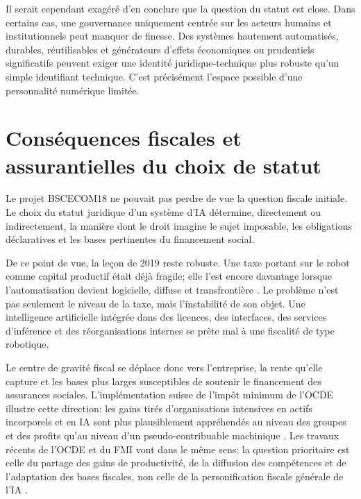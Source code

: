 \documentclass[11pt]{article}
\begin{document}
Il serait cependant exag{\'e}r{\'e} d'en conclure que la question du statut est close. Dans certains cas, une gouvernance uniquement centr{\'e}e sur les acteurs humains et institutionnels peut manquer de finesse. Des syst{\`e}mes hautement automatis{\'e}s, durables, r{\'e}utilisables et g{\'e}n{\'e}rateurs d'effets {\'e}conomiques ou prudentiels significatifs peuvent exiger une identit{\'e} juridique-technique plus robuste qu'un simple identifiant technique. C'est pr{\'e}cis{\'e}ment l'espace possible d'une personnalit{\'e} num{\'e}rique limit{\'e}e.

\section{Cons{\'e}quences fiscales et assurantielles du choix de statut}
Le projet BSCECOM18 ne pouvait pas perdre de vue la question fiscale initiale. Le choix du statut juridique d'un syst{\`e}me d'IA d{\'e}termine, directement ou indirectement, la mani{\`e}re dont le droit imagine le sujet imposable, les obligations d{\'e}claratives et les bases pertinentes du financement social.

De ce point de vue, la le{\c c}on de 2019 reste robuste. Une taxe portant sur le robot comme capital productif {\'e}tait d{\'e}j{\`a} fragile; elle l'est encore davantage lorsque l'automatisation devient logicielle, diffuse et transfronti{\`e}re \citep{graz2019,brollo2024}. Le probl{\`e}me n'est pas seulement le niveau de la taxe, mais l'instabilit{\'e} de son objet. Une intelligence artificielle int{\'e}gr{\'e}e dans des licences, des interfaces, des services d'inf{\'e}rence et des r{\'e}organisations internes se pr{\^e}te mal {\`a} une fiscalit{\'e} de type robotique.

Le centre de gravit{\'e} fiscal se d{\'e}place donc vers l'entreprise, la rente qu'elle capture et les bases plus larges susceptibles de soutenir le financement des assurances sociales. L'impl{\'e}mentation suisse de l'imp{\^o}t minimum de l'OCDE illustre cette direction: les gains tir{\'e}s d'organisations intensives en actifs incorporels et en IA sont plus plausiblement appr{\'e}hend{\'e}s au niveau des groupes et des profits qu'au niveau d'un pseudo-contribuable machinique \citep{swissfdf2024pillar2}. Les travaux r{\'e}cents de l'OCDE et du FMI vont dans le m{\^e}me sens: la question prioritaire est celle du partage des gains de productivit{\'e}, de la diffusion des comp{\'e}tences et de l'adaptation des bases fiscales, non celle de la personification fiscale g{\'e}n{\'e}rale de l'IA \citep{oecd2025adoption,oecd2025sme,brollo2024,wef2025jobs}.
\end{document}
